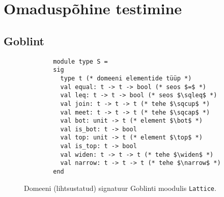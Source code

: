 \documentclass[../thesis.tex]{subfiles}
\begin{document}
\section{Omaduspõhine testimine}

\subsection{Goblint}

\begin{figure}
	\centering
	\begin{verbatim}
		module type S =
		sig
		  type t (* domeeni elementide tüüp *)
		  val equal: t -> t -> bool (* seos $=$ *)
		  val leq: t -> t -> bool (* seos $\sqleq$ *)
		  val join: t -> t -> t (* tehe $\sqcup$ *)
		  val meet: t -> t -> t (* tehe $\sqcap$ *)
		  val bot: unit -> t (* element $\bot$ *)
		  val is_bot: t -> bool
		  val top: unit -> t (* element $\top$ *)
		  val is_top: t -> bool
		  val widen: t -> t -> t (* tehe $\widen$ *)
		  val narrow: t -> t -> t (* tehe $\narrow$ *)
		end
	\end{verbatim}
	\caption{Domeeni (lihtsustatud) signatuur Goblinti moodulis \texttt{Lattice}.}
	\label{fig:lattice-s}
\end{figure}




\end{document}
